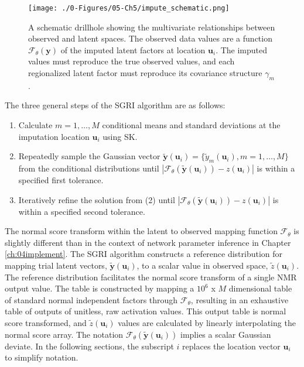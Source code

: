 \begin{figure}[htb!]
    \centering
    \texttt{[image: ./0-Figures/05-Ch5/impute\_schematic.png]}
    \caption{A schematic drillhole showing the multivariate relationships between observed and latent spaces. The observed data values are a function $\mathcal{F}_{\theta}\left(\mathbf{y}\right)$ of the imputed latent factors at location $\mathbf{u}_{i}$. The imputed values must reproduce the true observed values, and each regionalized latent factor must reproduce its covariance structure $\gamma_{m}$. }
    \label{fig:impute_schematic}
\end{figure}

The three general steps of the \gls{SGRI} algorithm are as follows:
\begin{enumerate}[noitemsep]
    \item Calculate $m=1,\dots,M$ conditional means and standard deviations at the imputation location $\mathbf{u}_{i}$ using \gls{SK}.
    \item Repeatedly sample the Gaussian vector $\tilde{\mathbf{y}}(\mathbf{u}_{i}) = \{\tilde{y}_{m}(\mathbf{u}_{i}), m=1,\dots,M \}$ from the conditional distributions until $\left|\mathcal{F}_{\theta}(\tilde{\mathbf{y}}(\mathbf{u}_{i})) - z(\mathbf{u}_{i})\right|$ is within a specified first tolerance.
    \item Iteratively refine the solution from (2) until $\left|\mathcal{F}_{\theta}(\tilde{\mathbf{y}}(\mathbf{u}_{i})) - z(\mathbf{u}_{i})\right|$ is within a specified second tolerance.
\end{enumerate}

The normal score transform within the latent to observed mapping function $\mathcal{F}_{\theta}$ is slightly different than in the context of network parameter inference in Chapter \ref{ch:04implement}. The \gls{SGRI} algorithm constructs a reference distribution for mapping trial latent vectors, $\tilde{\mathbf{y}}(\mathbf{u}_{i})$,  to a scalar value in observed space, $\tilde{z}(\mathbf{u}_{i})$. The reference distribution facilitates the normal score transform of a single NMR output value. The table is constructed by mapping a $10^{6}$ x $M$ dimensional table of standard normal independent factors through  $\mathcal{F}_{\theta}$, resulting in an exhaustive table of outputs of unitless, raw activation values. This output table is normal score transformed, and $\tilde{z}(\mathbf{u}_{i})$ values are calculated by linearly interpolating the normal score array. The notation $\mathcal{F}_{\theta}(\tilde{\mathbf{y}}(\mathbf{u}_{i}))$ implies a scalar Gaussian deviate. In the following sections, the subscript $i$ replaces the location vector $\mathbf{u}_{i}$ to simplify notation.

